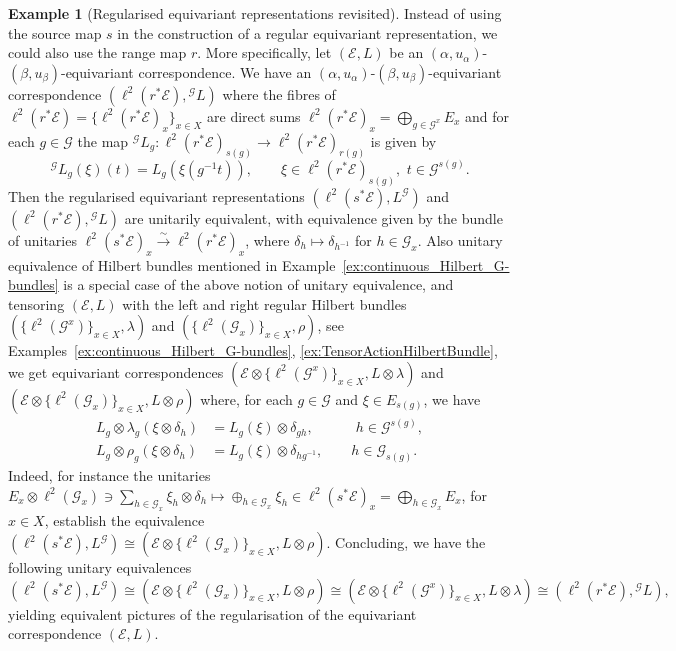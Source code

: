 \documentclass[11 pt, leqno]{amsart}
\numberwithin{equation}{section}
\theoremstyle{plain}
\theoremstyle{definition}
\newtheorem{ex}[thm]{Example}
\newcommand*{\congto}{\xrightarrow\sim}
\newcommand{\G}{\mathcal G} %
\newcommand{\EE}{\mathcal E}
\begin{document}
\begin{ex}[Regularised equivariant representations revisited]\label{ex:regularized_equivariant_correspondences_revisited}
Instead of using the source map $s$ in the construction of a regular equivariant representation, we could also use the range map $r$. 
More specifically, let $(\EE,L)$ be an $(\alpha,u_{\alpha})$-$(\beta,u_{\beta})$-equivariant correspondence. 
We have an $(\alpha,u_{\alpha})$-$(\beta,u_{\beta})$-equivariant correspondence $(\ell^2(r^*\EE), {^{\G}L})$ where the fibres of $\ell^2(r^*\EE) = \{ \ell^2(r^*\EE)_x \}_{x\in X}$ are direct sums $\ell^2(r^*\EE)_x = \bigoplus_{g \in \G^x} E_x$ and for each $g \in \G$  the map ${^{\G}L}_{g}:\ell^2(r^*\EE)_{s(g)}\to \ell^2(r^*\EE)_{r(g)}$ is given by  
\[%
    ^{\G}L_{g}(\xi)(t) = L_g (\xi (g^{-1}t)), \qquad 
    \xi\in \ell^2(r^*\EE)_{s(g)},\,\, t \in \G^{s(g)}.    
\]%
Then the regularised equivariant representations $(\ell^2(s^*\EE), L^{\G})$ and $(\ell^2(r^*\EE), {^{\G}L})$  are unitarily equivalent, with equivalence given by the bundle of unitaries $\ell^2(s^*\EE)_x\congto \ell^2(r^*\EE)_x$, where $\delta_h\mapsto \delta_{h^{-1}}$ for $h\in \G_{x}$.
Also unitary equivalence of Hilbert bundles mentioned in Example~\ref{ex:continuous_Hilbert_G-bundles} is a special case of the above notion of unitary equivalence, and tensoring $(\EE,L)$  with the left and right regular Hilbert bundles $(\{\ell^2(\G^x)\}_{x\in X}, \lambda)$ and  $(\{\ell^2(\G_x)\}_{x\in X}, \rho)$, see Examples~\ref{ex:continuous_Hilbert_G-bundles}, \ref{ex:TensorActionHilbertBundle}, we get equivariant correspondences $(\EE\otimes \{\ell^2(\G^x)\}_{x\in X},L\otimes \lambda)$ and $(\EE\otimes \{\ell^2(\G_x)\}_{x\in X}, L\otimes\rho)$ where, for each $g\in \G$ and $\xi \in E_{s(g)}$, we have
\begin{align*}
    L_g\otimes \lambda_g(\xi \otimes \delta_h)&=L_g(\xi)\otimes \delta_{gh}, \qquad\quad h\in \G^{s(g)},
    \\
    L_g\otimes \rho_g(\xi \otimes \delta_h)&=L_g(\xi)\otimes \delta_{hg^{-1}}, \qquad h\in \G_{s(g)}.
\end{align*}
Indeed, for instance the unitaries $E_x\otimes \ell^2(\G_x)\ni \sum_{h\in \G_x} \xi_h\otimes \delta_h \longmapsto \oplus_{h\in \G_x}\xi_h \in \ell^2(s^*\EE)_x=\bigoplus_{h\in \G_x} E_x$, for $x\in X$, establish the equivalence $(\ell^2(s^*\EE), L^{\G})\cong (\EE\otimes \{\ell^2(\G_x)\}_{x\in X}, L\otimes\rho)$. 
Concluding, we have the following unitary equivalences
\[
    (\ell^2(s^*\EE), L^{\G})\cong (\EE\otimes \{\ell^2(\G_x)\}_{x\in X}, L\otimes\rho)\cong (\EE\otimes \{\ell^2(\G^x)\}_{x\in X},L\otimes \lambda)\cong (\ell^2(r^*\EE), {^{\G}L}) , 
\]
 yielding equivalent pictures of the regularisation of the equivariant correspondence $(\EE,L)$.
\end{ex}
\end{document}
